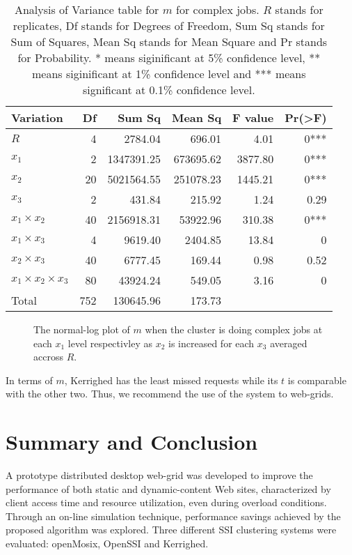 \documentclass[preprint]{acm_proc_article-sp}
\begin{document}
\begin{table*}
	\caption{Analysis of Variance table for $m$ for complex jobs. $R$ stands for replicates, Df stands for Degrees of Freedom, Sum Sq stands for Sum of Squares, Mean Sq stands for Mean Square and Pr stands for Probability. * means siginificant at 5\% confidence level, ** means siginificant at 1\% confidence level and *** means significant at 0.1\% confidence level.}
	\label{table4}
	\centering
	\begin{tabular}{l|rrrrr}
		\hline\hline
		Variation&Df&Sum Sq&Mean Sq&F value&Pr(>F)\\
		\hline
		$R$&4&2784.04&696.01&4.01&0***\\
		$x_1$&2&1347391.25&673695.62&3877.80&0***\\
		$x_2$&20&5021564.55&251078.23&1445.21&0***\\
		$x_3$&2&431.84&215.92&1.24&0.29\\
		$x_1 \times x_2$&40&2156918.31&53922.96&310.38&0***\\
		$x_1 \times x_3$&4&9619.40&2404.85&13.84&0\\
		$x_2 \times x_3$&40&6777.45&169.44&0.98&0.52\\
		$x_1 \times x_2 \times x_3$&80&43924.24&549.05&3.16&0\\
		\hline
		Total&752&130645.96&173.73\\
		\hline\hline
	\end{tabular}
\end{table*}

\begin{figure*}[htb]
        \centering
{}
        \caption{The normal-log plot of $m$ when the cluster is doing complex jobs at each $x_1$ level respectivley as $x_2$ is increased for each $x_3$ averaged accross $R$.}
        \label{res4}
\end{figure*}

In terms of $m$, Kerrighed has the least missed requests while its $t$ is comparable with the other two. Thus, we recommend the use of the system to web-grids.

\section{Summary and Conclusion}
A prototype distributed desktop web-grid was developed to improve the performance of both static and dynamic-content Web sites, characterized by client access time and resource utilization, even during overload conditions. Through an on-line simulation technique, performance savings achieved by the proposed algorithm was explored. Three different SSI clustering systems were evaluated: openMosix, OpenSSI and Kerrighed.
\end{document}
